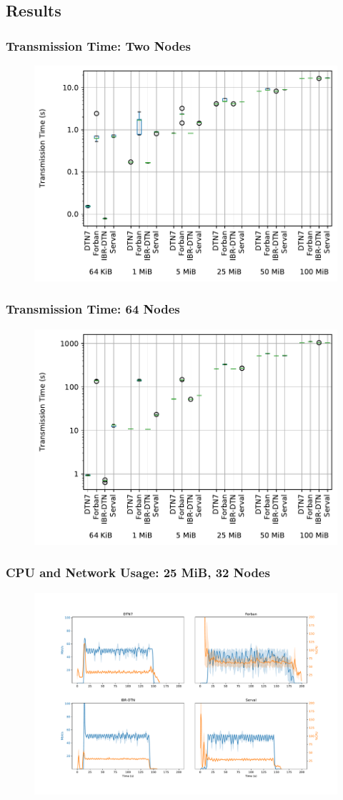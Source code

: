 \subsection{Results}

\begin{frame}
  \frametitle{Transmission Time: Two Nodes}

  \begin{figure}
    \includegraphics[width=0.8\linewidth,keepaspectratio]{include/chain-runtimes-2}
  \end{figure}
\end{frame}

\begin{frame}
  \frametitle{Transmission Time: 64 Nodes}

  \begin{figure}
    \includegraphics[width=0.8\linewidth,keepaspectratio]{include/chain-runtimes-64}
  \end{figure}
\end{frame}

\begin{frame}
  \frametitle{CPU and Network Usage: 25 MiB, 32 Nodes}

  \begin{figure}
    \includegraphics[width=0.9\linewidth,keepaspectratio]{include/cpu-load}
  \end{figure}
\end{frame}
